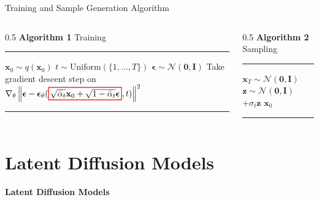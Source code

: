 \documentclass[aspectratio=169,xcolor=dvipsnames,svgnames,x11names,fleqn]{beamer}
\begin{document}
\begin{frame}{Training and Sample Generation Algorithm}

\begin{columns}[t]
        \begin{column}{0.5\textwidth}
            \textbf{Algorithm 1} Training
            \hrule
            \begin{algorithmic}[1]
                \REPEAT
                \STATE $\mathbf{x}_0 \sim q(\mathbf{x}_0)$
                \STATE $t \sim \text{Uniform}(\{1, \dots, T\})$
                \STATE $\boldsymbol{\epsilon} \sim \mathcal{N}(\mathbf{0}, \mathbf{I})$
                \STATE Take gradient descent step on
                \STATE $\nabla_\theta \left\| \boldsymbol{\epsilon} - \boldsymbol{\epsilon}_\theta(\redbox{$\sqrt{\bar{\alpha}_t}\mathbf{x}_0 + \sqrt{1 - \bar{\alpha}_t}\boldsymbol{\epsilon}$}, t) \right\|^2$
            \end{algorithmic}
            \hrule
        \end{column}

        \begin{column}{0.5\textwidth}
            \textbf{Algorithm 2} Sampling
            \hrule
            \begin{algorithmic}[1]
                \STATE $\mathbf{x}_T \sim \mathcal{N}(\mathbf{0}, \mathbf{I})$
                \STATE $\mathbf{z} \sim \mathcal{N}(\mathbf{0}, \mathbf{I})$
                \STATE {} $+ \sigma_t \mathbf{z}$
                \ENDFOR
                \RETURN $\mathbf{x}_0$
            \end{algorithmic}
            \hrule
        \end{column}
    \end{columns}
    

\end{frame}   
    
    \section{Latent Diffusion Models}
    
    \begin{frame}{}
    \begin{center}
        \huge \bf \color{DarkBlue}
        Latent Diffusion Models
    \end{center}
    \end{frame}
    
\end{document}
